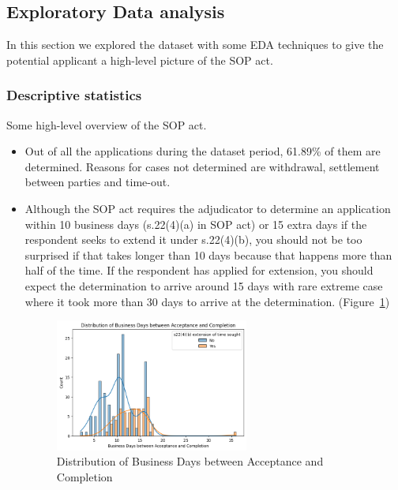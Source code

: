 \documentclass[12pt, b4paper]{article}
\begin{document}
    \subsection{Exploratory Data analysis}
    In this section we explored the dataset with some EDA techniques to give the potential applicant a high-level picture of the SOP act. 
      \subsubsection{Descriptive statistics}
      Some high-level overview of the SOP act.
        \begin{itemize}
          \item Out of all the applications during the dataset period, 61.89\% of them are determined. Reasons for cases not determined are withdrawal, settlement between parties and time-out.
          \item Although the SOP act requires the adjudicator to determine an application within 10 business days (s.22(4)(a) in SOP act) or 15 extra days if the respondent seeks to extend it under s.22(4)(b), you should not be too surprised if that takes longer than 10 days because that happens more than half of the time. If the respondent has applied for extension, you should expect the determination to arrive around 15 days with rare extreme case where it took more than 30 days to arrive at the determination. (Figure~\ref{fig:daysAccepComp}) 
            \begin{figure}
              \begin{center}
                \includegraphics[width=0.6\textwidth]{plots/daysAccepComp.png}
              \end{center}
              \caption{Distribution of Business Days between Acceptance and Completion}
              \label{fig:daysAccepComp}
            \end{figure}
        \end{itemize} 
\end{document}
